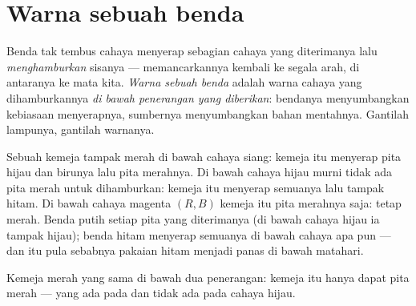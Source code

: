 \section{Warna sebuah benda}

\begin{definition}\label{def:g11:color-light-sources:objectcolor}
Benda tak tembus cahaya menyerap sebagian cahaya yang diterimanya lalu
\emph{menghamburkan} sisanya --- memancarkannya
kembali ke segala arah, di antaranya ke mata kita. \emph{Warna sebuah
benda} adalah warna cahaya yang dihamburkannya
\emph{di bawah penerangan yang diberikan}: bendanya menyumbangkan
kebiasaan menyerapnya, sumbernya menyumbangkan bahan mentahnya. Gantilah
lampunya, gantilah warnanya.
\end{definition}

\begin{example}\label{ex:g11:color-light-sources:redshirt}
Sebuah kemeja tampak merah di bawah cahaya siang: kemeja itu menyerap
pita hijau dan birunya lalu  pita merahnya. Di bawah
cahaya hijau murni tidak ada pita merah untuk dihamburkan: kemeja itu
menyerap semuanya lalu tampak hitam. Di bawah cahaya magenta $(R, B)$
kemeja itu  pita merahnya saja: tetap merah. Benda putih
 setiap pita yang diterimanya (di bawah cahaya hijau ia
tampak hijau); benda hitam menyerap semuanya di bawah cahaya apa pun
--- dan itu pula sebabnya pakaian hitam menjadi panas di bawah
matahari.
\end{example}

\begin{omfigure}
\qquad
{}

{\small Kemeja merah yang sama di bawah dua penerangan: kemeja itu
hanya dapat  pita merah --- yang ada pada  dan
tidak ada pada cahaya hijau.}
\end{omfigure}

